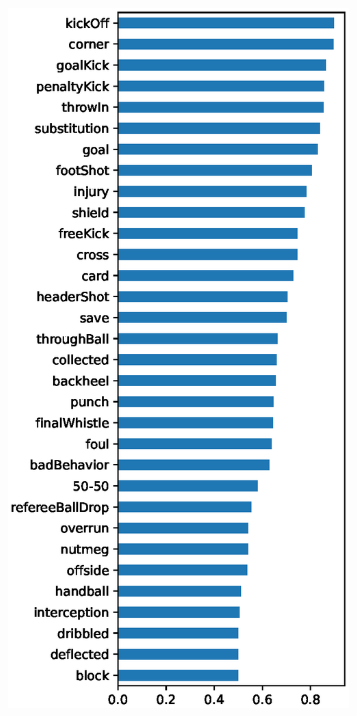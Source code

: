 
\begin{figure}
    \centering
    \begin{subfigure}{.24\textwidth}
        \centering
        \includegraphics[width=0.99\textwidth, keepaspectratio, interpolate]{img/07_ba_by_class_ph_2.eps}

\end{subfigure}
\end{figure}
